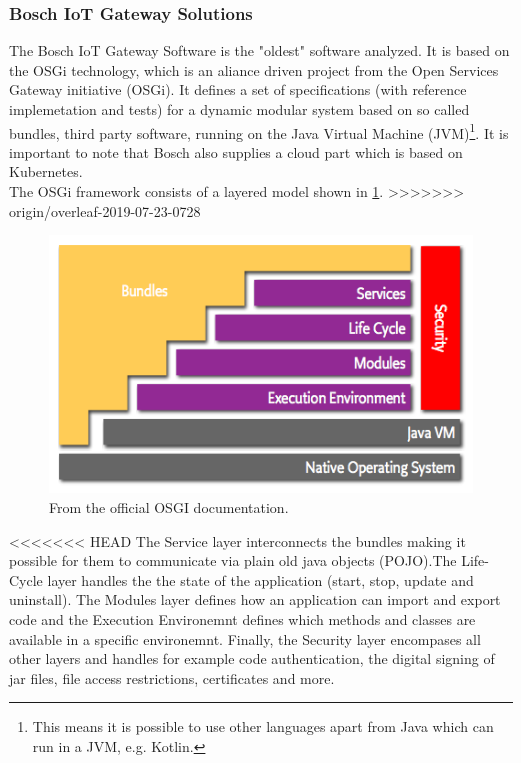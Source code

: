 \subsubsection{Bosch IoT Gateway Solutions}
The Bosch IoT Gateway Software\cite{BoschIoT13:online} is the "oldest" software analyzed. It is based on the OSGi technology\cite{osgiDefintion25:online}, which is an aliance driven project from the Open Services Gateway initiative (OSGi). It defines a set of specifications (with reference implemetation and tests) for a dynamic modular system based on so called bundles, third party software, running on the Java Virtual Machine (JVM)\footnote{This means it is possible to use other languages apart from Java which can run in a JVM, e.g. Kotlin.}. It is important to note that Bosch also supplies a cloud part which is based on Kubernetes.\\
The OSGi framework consists of a layered model shown in \cref{fig:osgiLayerModel}. 
>>>>>>> origin/overleaf-2019-07-23-0728
\begin{figure}[h!]
    \centering
    \includegraphics[scale=0.8]{figures/layering-osgi.png}
    \caption{From the official OSGI documentation\cite{osgiFrameworkArchitec22:online}.}
    \label{fig:osgiLayerModel}
\end{figure}
<<<<<<< HEAD
The Service layer interconnects the bundles making it possible for them to communicate via plain old java objects (POJO).The Life-Cycle layer handles the the state of the application (start, stop, update and uninstall). The Modules layer defines how an application can import and export code and the Execution Environemnt defines which methods and classes are available in a specific environemnt. Finally, the Security layer encompases all other layers and handles for example code authentication, the digital signing of jar files, file access restrictions, certificates and more.\\

